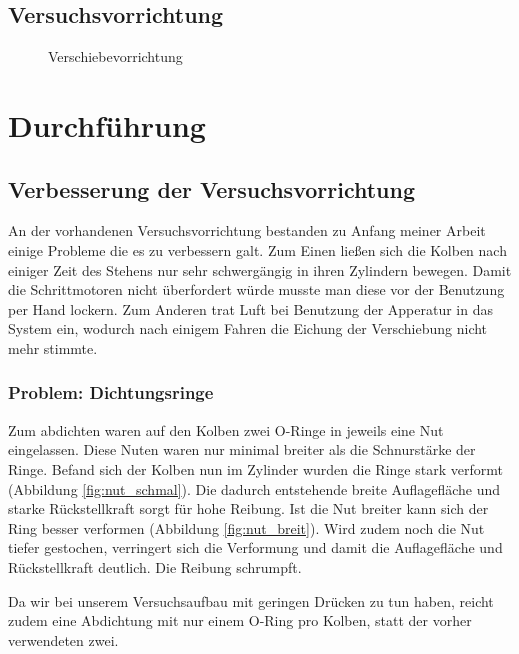 \documentclass[
    11pt,
    ngerman
]{scrreprt}
\begin{document}
\section{Versuchsvorrichtung}

\begin{figure}[htbp]
    \centering
    \resizebox{\textwidth}{!}{}
    \caption{%
        Verschiebevorrichtung
    }
    \label{fig:aufbau_total}
\end{figure}


\chapter{Durchführung}

\section{Verbesserung der Versuchsvorrichtung}

An der vorhandenen Versuchsvorrichtung bestanden zu Anfang meiner Arbeit einige
Probleme die es zu verbessern galt. Zum Einen ließen sich die Kolben nach
einiger Zeit des Stehens nur sehr schwergängig in ihren Zylindern bewegen.
Damit die Schrittmotoren nicht überfordert würde musste man diese vor der
Benutzung per Hand lockern. Zum Anderen trat Luft bei Benutzung der Apperatur
in das System ein, wodurch nach einigem Fahren die Eichung der Verschiebung
nicht mehr stimmte.  

\subsection{Problem: Dichtungsringe}

Zum abdichten waren auf den Kolben zwei O-Ringe in jeweils eine Nut
eingelassen. Diese Nuten waren nur minimal breiter als die Schnurstärke der
Ringe. Befand sich der Kolben nun im Zylinder wurden die Ringe stark verformt
(Abbildung \ref{fig:nut_schmal}). Die dadurch entstehende breite Auflagefläche
und starke Rückstellkraft sorgt für hohe Reibung. Ist die Nut breiter kann sich
der Ring besser verformen (Abbildung \ref{fig:nut_breit}). Wird zudem noch die
Nut tiefer gestochen, verringert sich die Verformung und damit die
Auflagefläche und Rückstellkraft deutlich. Die Reibung schrumpft.

Da wir bei unserem Versuchsaufbau mit geringen Drücken zu tun haben, reicht
zudem eine Abdichtung mit nur einem O-Ring pro Kolben, statt der vorher
verwendeten zwei.
\end{document}
